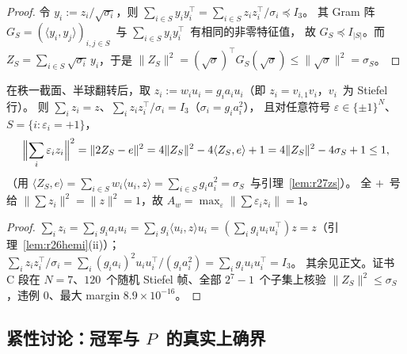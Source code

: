 \begin{proof}
令 $y_i:=z_i/\sqrt{\sigma_i}$，则 $\sum_{i\in S}y_iy_i^\top=\sum_{i\in S}z_iz_i^\top/\sigma_i\preceq I_3$。
其 Gram 阵 $G_S=(\langle y_i,y_j\rangle)_{i,j\in S}$~与 $\sum_{i\in S}y_iy_i^\top$~有相同的非零特征值，
故 $G_S\preceq I_{|S|}$。而 $Z_S=\sum_{i\in S}\sqrt{\sigma_i}\,y_i$，于是
$\|Z_S\|^2=(\sqrt{\sigma})^\top G_S(\sqrt{\sigma})\le\|\sqrt\sigma\|^2=\sigma_S$。
\end{proof}

\begin{proposition}[$A_w=1$~的新证明]\label{prop:r27aw}
在秩一截面、半球翻转后，取 $z_i:=w_iu_i=g_ia_iu_i$（即 $z_i=v_{i,1}v_i$，$v_i$~为 Stiefel 行）。
则 $\sum_iz_i=z$、$\sum_iz_iz_i^\top/\sigma_i=I_3$（$\sigma_i=g_ia_i^2$），
且对任意符号 $\varepsilon\in\{\pm1\}^N$、$S=\{i:\varepsilon_i=+1\}$，
\[
\Bigl\|\sum_i\varepsilon_iz_i\Bigr\|^2=\|2Z_S-e\|^2=4\|Z_S\|^2-4\langle Z_S,e\rangle+1
=4\|Z_S\|^2-4\sigma_S+1\le1,
\]
（用 $\langle Z_S,e\rangle=\sum_{i\in S}w_i\langle u_i,z\rangle=\sum_{i\in S}g_ia_i^2=\sigma_S$~与引理~\ref{lem:r27zs}）。
全 $+$~号给 $\|\sum z_i\|^2=\|z\|^2=1$，故 $A_w=\max_\varepsilon\|\sum\varepsilon_iz_i\|=1$。
\end{proposition}

\begin{proof}
$\sum_iz_i=\sum_ig_ia_iu_i=\sum_ig_i\langle u_i,z\rangle u_i=(\sum_ig_iu_iu_i^\top)z=z$（引理~\ref{lem:r26hemi}(ii)）；
$\sum_iz_iz_i^\top/\sigma_i=\sum_i(g_ia_i)^2u_iu_i^\top/(g_ia_i^2)=\sum_ig_iu_iu_i^\top=I_3$。
其余见正文。证书 C 段在 $N=7$、$120$~个随机 Stiefel 帧、全部 $2^7-1$~个子集上核验
$\|Z_S\|^2\le\sigma_S$，违例 $0$、最大 margin $8.9\times10^{-16}$。
\end{proof}

\subsection{紧性讨论：冠军与 $P$~的真实上确界}\label{sec:r27:tight}

